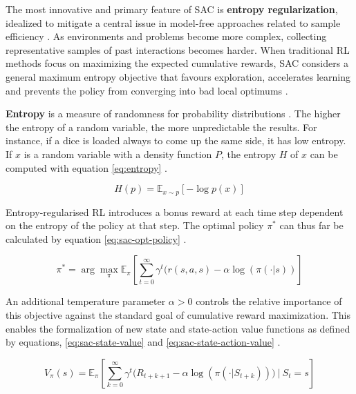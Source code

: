 The most innovative and primary feature of \ac{SAC} is \textbf{entropy regularization}, idealized to mitigate a central issue in model-free approaches related to sample efficiency \cite{openaiSpinningDocumentation, haarnojaSoftActorCriticOffPolicy2018}. As environments and problems become more complex, collecting representative samples of past interactions becomes harder. When traditional \ac{RL} methods focus on maximizing the expected cumulative rewards, \ac{SAC} considers a general maximum entropy objective that favours exploration, accelerates learning and prevents the policy from converging into bad local optimums \cite{haarnojaSoftActorCriticOffPolicy2018}.

\textbf{Entropy} is a measure of randomness for probability distributions \cite{openaiSpinningDocumentation}. The higher the entropy of a random variable, the more unpredictable the results. For instance, if a dice is loaded always to come up the same side, it has low entropy. If $x$ is a random variable with a density function $P$, the entropy $H$ of $x$ can be computed with equation  \ref{eq:entropy} \cite{openaiSpinningDocumentation}.

\begin{equation} \label{eq:entropy}
H(p) = \mathbb{E}_{x \sim p}[-\log p(x)]
\end{equation} 

Entropy-regularised \ac{RL} introduces a bonus reward at each time step dependent on the entropy of the policy at that step. The optimal policy $\pi^*$ can thus far be calculated by equation \ref{eq:sac-opt-policy} \cite{openaiSpinningDocumentation}.

\begin{equation} \label{eq:sac-opt-policy}
\pi^* = \arg \max_\pi \mathbb{E}_{\pi} [ \sum_{t=0}^\infty \gamma^t (r(s, a, s) - \alpha \log(\pi(\cdot|s))]
\end{equation} 

An additional temperature parameter $\alpha > 0$ controls the relative importance of this objective against the standard goal of cumulative reward maximization. This enables the formalization of new state and state-action value functions as defined by equations, \ref{eq:sac-state-value} and \ref{eq:sac-state-action-value} \cite{openaiSpinningDocumentation, haarnojaSoftActorCriticOffPolicy2018}.

\begin{equation} \label{eq:sac-state-value}
V_\pi(s) = \mathbb{E}_{\pi} \left[ \sum_{k=0}^\infty \gamma^t \Big(R_{t+k+1} - \alpha \log \left(\pi(\cdot | S_{t+k}) \right) \Big)\ \Bigg|\ S_t = s \right]
\end{equation} 

